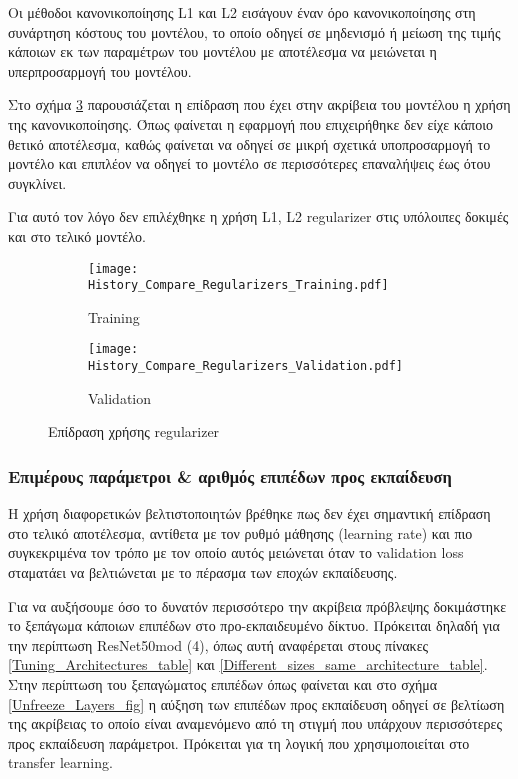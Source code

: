 Οι μέθοδοι κανονικοποίησης L1 και L2 εισάγουν έναν όρο κανονικοποίησης στη συνάρτηση κόστους του μοντέλου, το οποίο οδηγεί σε μηδενισμό ή μείωση της τιμής κάποιων εκ των παραμέτρων του μοντέλου με αποτέλεσμα να μειώνεται η υπερπροσαρμογή του μοντέλου. 

Στο σχήμα \ref{Different_regularizer_same_architecture_fig} παρουσιάζεται η επίδραση που έχει στην ακρίβεια του μοντέλου η χρήση της κανονικοποίησης. Όπως φαίνεται η εφαρμογή που επιχειρήθηκε δεν είχε κάποιο θετικό αποτέλεσμα, καθώς φαίνεται να οδηγεί σε μικρή σχετικά υποπροσαρμογή το μοντέλο και επιπλέον να οδηγεί το μοντέλο σε περισσότερες επαναλήψεις έως ότου συγκλίνει. 

Για αυτό τον λόγο δεν επιλέχθηκε η χρήση L1, L2 regularizer στις υπόλοιπες δοκιμές και στο τελικό μοντέλο. 

\begin{figure}[H]
\centering
\begin{subfigure}[t]{0.49\textwidth}
\texttt{[image: History\_Compare\_Regularizers\_Training.pdf]}
\caption{Training}
\label{image_regularizers_training}
\end{subfigure}
\begin{subfigure}[t]{0.49\textwidth}
\texttt{[image: History\_Compare\_Regularizers\_Validation.pdf]}
\caption{Validation}
\label{image_regularizers_validation}
\end{subfigure}
\caption{Επίδραση χρήσης regularizer}
\label{Different_regularizer_same_architecture_fig}
\end{figure}

\subsubsection{Επιμέρους παράμετροι \& αριθμός επιπέδων προς εκπαίδευση}
Η χρήση διαφορετικών βελτιστοποιητών βρέθηκε πως δεν έχει σημαντική επίδραση στο τελικό αποτέλεσμα, αντίθετα με τον ρυθμό μάθησης (learning rate) και πιο συγκεκριμένα τον τρόπο με τον οποίο αυτός μειώνεται όταν το validation loss σταματάει να βελτιώνεται με το πέρασμα των εποχών εκπαίδευσης. 

Για να αυξήσουμε όσο το δυνατόν περισσότερο την ακρίβεια πρόβλεψης δοκιμάστηκε το ξεπάγωμα κάποιων επιπέδων στο προ-εκπαιδευμένο δίκτυο. Πρόκειται δηλαδή για την περίπτωση ResNet50mod (4), όπως αυτή αναφέρεται στους πίνακες \ref{Tuning_Architectures_table} και \ref{Different_sizes_same_architecture_table}. Στην περίπτωση του ξεπαγώματος επιπέδων όπως φαίνεται και στο σχήμα \ref{Unfreeze_Layers_fig} η αύξηση των επιπέδων προς εκπαίδευση οδηγεί σε βελτίωση της ακρίβειας το οποίο είναι αναμενόμενο από τη στιγμή που υπάρχουν περισσότερες προς εκπαίδευση παράμετροι. Πρόκειται για τη λογική που χρησιμοποιείται στο transfer learning.

